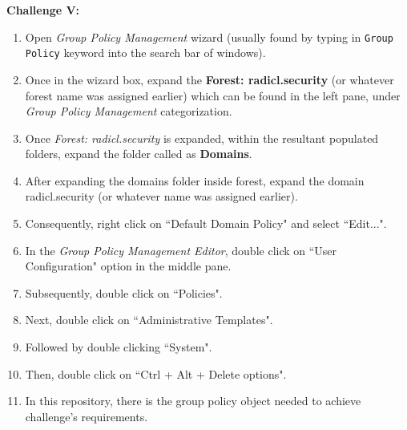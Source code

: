 \documentclass[12pt]{extarticle}
\newcommand{\ben}{\begin{enumerate}}
\newcommand{\een}{\end{enumerate}}
\begin{document}
		
		\vspace{4mm}
		\item \textbf{Challenge V:}
		\ben
			\item Open \textit{Group Policy Management} wizard (usually found by typing in \texttt{Group Policy} keyword into the search bar of windows).
			\item Once in the wizard box, expand the \textbf{Forest: radicl.security} (or whatever forest name was assigned earlier) which can be found in the left pane, under \textit{Group Policy Management} categorization.
			\item Once \textit{Forest: radicl.security} is expanded, within the resultant populated folders, expand the folder called as \textbf{Domains}.
			\item After expanding the domains folder inside forest, expand the domain radicl.security (or whatever name was assigned earlier).
			\item Consequently, right click on ``Default Domain Policy" and select ``Edit...".
			\item In the \textit{Group Policy Management Editor}, double click on ``User Configuration" option in the middle pane.
			\item Subsequently, double click on ``Policies".
			\item Next, double click on ``Administrative Templates".
			\item Followed by double clicking ``System".
			\item Then, double click on ``Ctrl + Alt + Delete options".
			\item In this repository, there is the group policy object needed to achieve challenge's requirements.
		\een
		
		
		
\end{document}
